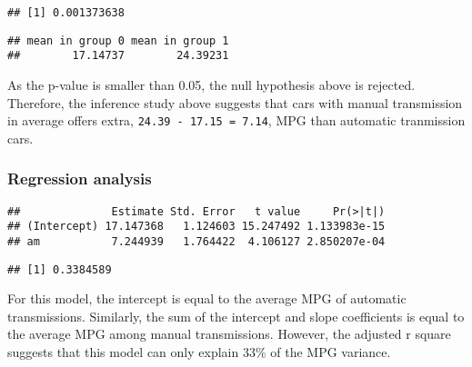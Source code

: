 \documentclass[]{article}
\newenvironment{Shaded}{\begin{snugshade}}{\end{snugshade}}
\newcommand{\KeywordTok}[1]{\textcolor[rgb]{0.13,0.29,0.53}{\textbf{{#1}}}}
\newcommand{\DataTypeTok}[1]{\textcolor[rgb]{0.13,0.29,0.53}{{#1}}}
\newcommand{\StringTok}[1]{\textcolor[rgb]{0.31,0.60,0.02}{{#1}}}
\newcommand{\NormalTok}[1]{{#1}}
\begin{document}
\begin{Shaded}
\end{Shaded}

\begin{verbatim}
## [1] 0.001373638
\end{verbatim}

\begin{verbatim}
## mean in group 0 mean in group 1 
##        17.14737        24.39231
\end{verbatim}

As the p-value is smaller than 0.05, the null hypothesis above is
rejected. Therefore, the inference study above suggests that cars with
manual transmission in average offers extra,
\texttt{24.39 - 17.15 = 7.14}, MPG than automatic tranmission cars.

\subsubsection{Regression analysis}\label{regression-analysis}

\begin{Shaded}
\end{Shaded}

\begin{verbatim}
##              Estimate Std. Error   t value     Pr(>|t|)
## (Intercept) 17.147368   1.124603 15.247492 1.133983e-15
## am           7.244939   1.764422  4.106127 2.850207e-04
\end{verbatim}

\begin{verbatim}
## [1] 0.3384589
\end{verbatim}

For this model, the intercept is equal to the average MPG of automatic
transmissions. Similarly, the sum of the intercept and slope
coefficients is equal to the average MPG among manual transmissions.
However, the adjusted r square suggests that this model can only explain
33\% of the MPG variance.
\end{document}
